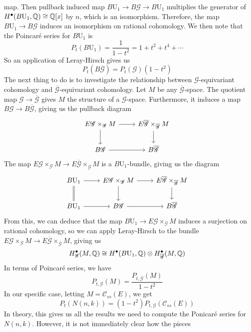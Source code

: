 map. Then pullback induced map $B \mathrm{U}_1 \to B\mathscr{G} \to B \mathrm{U}_1$
multiplies the generator of $H^\bullet(B \mathrm{U}_1, \mathbb{Q}) \cong \mathbb{Q}[x]$ by $n$,
which is an isomorphism. Therefore, the map $B \mathrm{U}_1 \to B\mathscr{G}$
induces an isomorphism on rational cohomology. We then note that the
Poincar\'e series for $B \mathrm{U}_1$ is
\[
P_t(B \mathrm{U}_1) = \frac{1}{1-t^2} = 1 + t^2 + t^4 + \cdots
\]
So an application of Leray-Hirsch gives us
\[
P_t(B\overline{\mathscr{G}}) = P_t(\mathscr{G})(1-t^2)
\]
The next thing to do is to investigate the relationship between
$\mathscr{G}$-equivariant cohomology and $\overline{\mathscr{G}}$-equivariant
cohomology. Let $M$ be any $\overline{\mathscr{G}}$-space. The quotient map
$\mathscr{G} \to \overline{\mathscr{G}}$ gives $M$ the structure of
a $\mathscr{G}$-space. Furthermore, it induces a map
$B\mathscr{G} \to B\overline{\mathscr{G}}$, giving us the pullback diagram
\[\begin{tikzcd}
E\mathscr{G} \times_{\mathscr{G}} M \ar[r] \ar[d] &
E\overline{\mathscr{G}} \times_{\overline{\mathscr{G}}} M \ar[d] \\
B\mathscr{G} \ar[r] & B\overline{\mathscr{G}}
\end{tikzcd}\]
The map $E\mathscr{G} \times_{\mathscr{G}} M
\to E\overline{\mathscr{G}} \times_{\overline{\mathscr{G}}} M$ is a
$B \mathrm{U}_1$-bundle, giving us the diagram
\[\begin{tikzcd}
B \mathrm{U}_1 \ar[r] \ar[d,equals]& E\mathscr{G} \times_{\mathscr{G}} M \ar[r] \ar[d] &
E\overline{\mathscr{G}} \times_{\overline{\mathscr{G}}} M \ar[d] \\
B \mathrm{U}_1 \ar[r] & B\mathscr{G} \ar[r] & B\overline{\mathscr{G}}
\end{tikzcd}\]
From this, we can deduce that the map
$B \mathrm{U}_1 \to E\mathscr{G}\times_{\mathscr{G}} M$ induces a surjection
on rational cohomology, so we can apply Leray-Hirsch to the bundle
$E\mathscr{G} \times_{\mathscr{G}} M
\to E\overline{\mathscr{G}} \times_{\overline{\mathscr{G}}} M$,
giving us
\[
H^\bullet_{\mathscr{G}}(M,\mathbb{Q}) \cong
H^\bullet(B\mathrm{U}_1, \mathbb{Q}) \otimes H^\bullet_{\overline{\mathscr{G}}}(M,\mathbb{Q})
\]
In terms of Poincar\'e series, we have
\[
P_{t,\mathscr{G}}(M) = \frac{P_{t,\overline{\mathscr{G}}}(M)}{1-t^2}
\]
In our specific case, letting $M = \mathscr{C}_{ss}(E)$, we get
\[
P_t(N(n,k)) = (1-t^2)P_{t,\mathscr{G}}(\mathscr{C}_{ss}(E))
\]
In theory, this gives us all the results we need to compute the Ponicar\'e
series for $N(n,k)$. However, it is not immediately clear how the pieces
